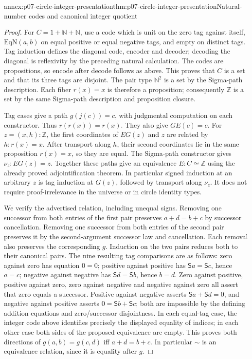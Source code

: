 \begin{annexitem}{annex:p07-circle-integer-presentation}{thm:p07-circle-integer-presentation}{Natural-number codes and canonical integer quotient}
\begin{proof}
For \(C=1+\mathbb N+\mathbb N\), use a code which is unit on the zero
tag against itself, \(\mathrm{EqN}(a,b)\) on equal positive or equal
negative tags, and empty on distinct tags. Tag induction defines the
diagonal code, encoder and decoder; decoding the diagonal is reflexivity
by the preceding natural calculation. The codes are propositions,
so encode after decode follows as above. This proves that \(C\) is a set
and that its three tags are disjoint. The pair type \(\mathbb N^2\)
is a set by the Sigma-path description. Each fiber \(r(x)=x\) is
therefore a proposition; consequently \(\mathbb Z\) is a set by the
same Sigma-path description and proposition closure.

Tag cases give a path \(g(j(c))=c\), with judgmental computation
on each constructor. Thus \(r(r(x))=r(x)\).
They also give \(GE(c)=c\). For \(z=(x,h):\mathbb Z\), the first
coordinates of \(EG(z)\) and \(z\) are related by \(h:r(x)=x\).
After transport along \(h\), their second coordinates lie in the same
proposition \(r(x)=x\), so they are equal. The Sigma-path constructor
gives
\(\nu_z:EG(z)=z\).
Together these paths give an equivalence \(E:C\simeq\mathbb Z\)
using the already proved adjointification theorem. In particular signed
induction at an arbitrary \(z\) is tag induction at \(G(z)\), followed by
transport along \(\nu_z\). It does not require proof-irrelevance in the
universe or in circle identity types.

We verify the advertised relation, including unequal signs. Removing
one successor from both entries of the first pair preserves
\(a+d=b+c\) by successor cancellation. Removing one successor from
both entries of the second pair preserves it by the second-argument
successor law and cancellation. Each removal also preserves the
corresponding \(g\). Induction on the two pairs reduces both to their
canonical pairs. The nine resulting tag comparisons are as follows:
zero against zero has equation \(0=0\); positive against positive has
\(\mathsf Sa=\mathsf Sc\), hence \(a=c\); negative against negative
has \(\mathsf Sd=\mathsf Sb\), hence \(b=d\).
Zero against positive, positive against zero, zero against negative and
negative against zero all assert that zero equals a successor.
Positive against negative asserts
\(\mathsf Sa+\mathsf Sd=0\), and negative against positive asserts
\(0=\mathsf Sb+\mathsf Sc\); both are impossible by the defining
addition equations and zero/successor disjointness.
In each equal-tag case, the integer code above identifies precisely
the displayed equality of indices; in each other case both sides of
the proposed equivalence are empty. This proves both directions of
\(g(a,b)=g(c,d)\) iff \(a+d=b+c\). In particular \(\sim\) is an
equivalence relation, since it is equality after \(g\).


\end{proof}
\end{annexitem}
